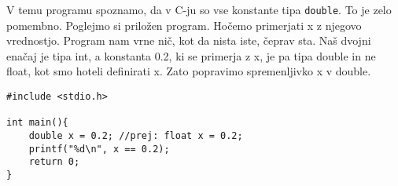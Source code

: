 \documentclass[a4paper, 12pt]{article}
\begin{document}
V temu programu spoznamo, da v C-ju so vse konstante tipa \lstinline|double|. To je zelo pomembno. Poglejmo si priložen program. Hočemo primerjati x z njegovo vrednostjo. Program nam vrne nič, kot da nista iste, čeprav sta. Naš dvojni enačaj je tipa int, a konstanta 0.2, ki se primerja z x, je pa tipa double in ne float, kot smo hoteli definirati x. Zato popravimo spremenljivko x v double.	
	
\begin{lstlisting}
#include <stdio.h>

int main(){
	double x = 0.2; //prej: float x = 0.2;
	printf("%d\n", x == 0.2);
	return 0;
}
\end{lstlisting}
\end{document}
